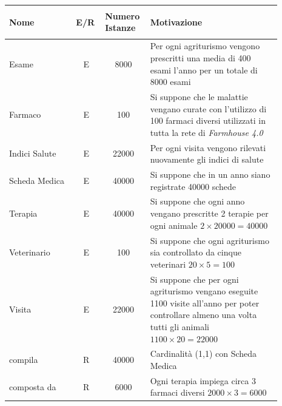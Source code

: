 \documentclass[12pt,a4paper]{article}
\begin{document}
\begin{center}\setlength{\extrarowheight}{1.5pt}\begin{longtable}{|p{0.23\linewidth}|p{0.1\linewidth}|p{0.11\linewidth}|p{0.45\linewidth}|}
\hline \textbf{Nome}   & \begin{center}\vspace{-15pt}\textbf{E/R}\end{center} & \textbf{Numero Istanze} & \textbf{Motivazione}\\ 

    
\hline
Esame
 & 
\multicolumn{1}{|c|}{E}
 & 
\multicolumn{1}{|c|}{8000}
 & 
Per ogni agriturismo vengono prescritti una media di 400 esami l'anno per un totale di 8000 esami
\\

\hline
Farmaco
 & 
\multicolumn{1}{|c|}{E}
 & 
\multicolumn{1}{|c|}{100}
 & 
Si suppone che le malattie vengano curate con l'utilizzo di 100 farmaci diversi utilizzati in tutta la rete di \textit{Farmhouse 4.0}
\\

\hline
Indici Salute
 & 
\multicolumn{1}{|c|}{E}
 & 
\multicolumn{1}{|c|}{22000}
 & 
Per ogni visita vengono rilevati nuovamente gli indici di salute
\\

\hline
Scheda Medica
 & 
\multicolumn{1}{|c|}{E}
 & 
\multicolumn{1}{|c|}{40000}
 & 
Si suppone che in un anno siano registrate 40000 schede
\\

\hline
Terapia
 & 
\multicolumn{1}{|c|}{E}
 & 
\multicolumn{1}{|c|}{40000}
 & 
Si suppone che ogni anno vengano prescritte 2 terapie per ogni animale $2\times 20000= 40000$
\\

\hline
Veterinario
 & 
\multicolumn{1}{|c|}{E}
 & 
\multicolumn{1}{|c|}{100}
 & 
Si suppone che ogni agriturismo sia controllato da cinque veterinari $20\times 5= 100$
\\

\hline
Visita
 & 
\multicolumn{1}{|c|}{E}
 & 
\multicolumn{1}{|c|}{22000}
 & 
Si suppone che per ogni agriturismo vengano eseguite 1100 visite all'anno per poter controllare almeno una volta tutti gli animali $1100\times 20= 22000$
\\

\hline
compila
 & 
\multicolumn{1}{|c|}{R}
 & 
\multicolumn{1}{|c|}{40000}
 & 
Cardinalità (1,1) con Scheda Medica
\\

\hline
composta da
 & 
\multicolumn{1}{|c|}{R}
 & 
\multicolumn{1}{|c|}{6000}
 & 
Ogni terapia impiega circa 3 farmaci diversi $2000\times 3 = 6000$
\\


\end{longtable}
\end{center}
\end{document}
